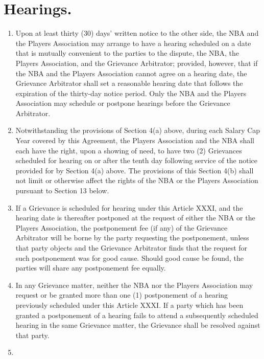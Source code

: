 \documentclass[
]{book}
\providecommand{\tightlist}{%
  \setlength{\itemsep}{0pt}\setlength{\parskip}{0pt}}
\begin{document}
\hypertarget{hearings.}{%
\section{Hearings.}\label{hearings.}}

\begin{enumerate}
\def\labelenumi{(\alph{enumi})}
\tightlist
\item
  Upon at least thirty (30) days' written notice to the other side, the NBA and the Players Association may arrange to have a hearing scheduled on a date that is mutually convenient to the parties to the dispute, the NBA, the Players Association, and the Grievance Arbitrator; provided, however, that if the NBA and the Players Association cannot agree on a hearing date, the Grievance Arbitrator shall set a reasonable hearing date that follows the expiration of the thirty-day notice period. Only the NBA and the Players Association may schedule or postpone hearings before the Grievance Arbitrator.
\item
  Notwithstanding the provisions of Section 4(a) above, during each Salary Cap Year covered by this Agreement, the Players Association and the NBA shall each have the right, upon a showing of need, to have two (2) Grievances scheduled for hearing on or after the tenth day following service of the notice provided for by Section 4(a) above. The provisions of this Section 4(b) shall not limit or otherwise affect the rights of the NBA or the Players Association pursuant to Section 13 below.
\item
  If a Grievance is scheduled for hearing under this Article XXXI, and the hearing date is thereafter postponed at the request of either the NBA or the Players Association, the postponement fee (if any) of the Grievance Arbitrator will be borne by the party requesting the postponement, unless that party objects and the Grievance Arbitrator finds that the request for such postponement was for good cause. Should good cause be found, the parties will share any postponement fee equally.
\item
  In any Grievance matter, neither the NBA nor the Players Association may request or be granted more than one (1) postponement of a hearing previously scheduled under this Article XXXI. If a party which has been granted a postponement of a hearing fails to attend a subsequently scheduled hearing in the same Grievance matter, the Grievance shall be resolved against that party.
\item

\end{enumerate}
\end{document}

